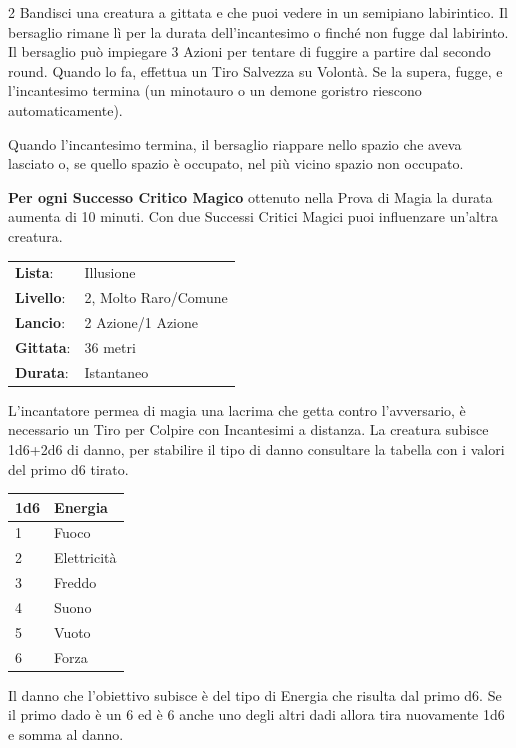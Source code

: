 \begin{multicols}{2}
Bandisci una creatura a gittata e che puoi vedere in un semipiano labirintico. Il bersaglio rimane lì per la durata dell'incantesimo o finché non fugge dal labirinto. Il bersaglio può impiegare 3 Azioni per tentare di fuggire a partire dal secondo round. Quando lo fa, effettua un Tiro Salvezza su Volontà. Se la supera, fugge, e l'incantesimo termina (un minotauro o un demone goristro riescono automaticamente).

Quando l'incantesimo termina, il bersaglio riappare nello spazio che aveva lasciato o, se quello spazio è occupato, nel più vicino spazio non occupato.

\textbf{Per ogni Successo Critico Magico} ottenuto nella Prova di Magia la durata aumenta di 10 minuti. Con due Successi Critici Magici puoi influenzare un'altra creatura.

\noindent\begin{tabularx}{\linewidth}{p{1.9cm}X}
	\rowcolor{gray!20}\textbf{Lista}: & Illusione \\
	\textbf{Livello}: & 2, Molto Raro/Comune \\
	\rowcolor{gray!20}\textbf{Lancio}: & 2 Azione/1 Azione \\
	\textbf{Gittata}: & 36 metri \\
	\rowcolor{gray!20}\textbf{Durata}: & Istantaneo \\
\end{tabularx}\smallskip

L'incantatore permea di magia una lacrima che getta contro l'avversario, è necessario un Tiro per Colpire con Incantesimi a distanza.
La creatura subisce 1d6+2d6 di danno, per stabilire il tipo di danno consultare la tabella con i valori del primo d6 tirato.

\medskip

\noindent\begin{tabular}{l|l}
	\toprule
 \rowcolor{gray!20}\textbf{1d6}&\textbf{Energia}\\
	\toprule
	1 &Fuoco\\
 \rowcolor{gray!20}2 &Elettricità\\
	3 &Freddo\\
 \rowcolor{gray!20}4 &Suono\\
	5 &Vuoto\\
 \rowcolor{gray!20}6 &Forza
\end{tabular}

\medskip

Il danno che l'obiettivo subisce è del tipo di Energia che risulta dal primo d6. Se il primo dado è un 6 ed è 6 anche uno degli altri dadi allora tira nuovamente 1d6 e somma al danno.


\end{multicols}
